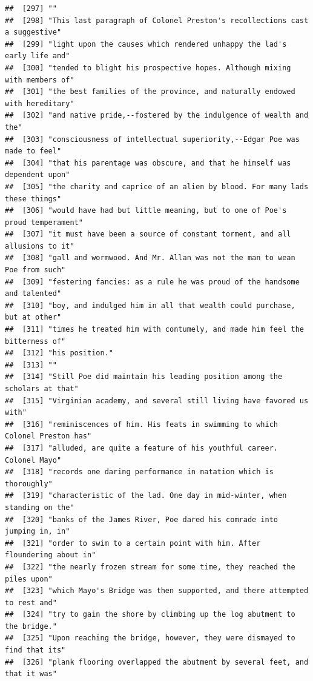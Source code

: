 \documentclass{article}\usepackage[]{graphicx}\usepackage[]{color}
\makeatletter
\newenvironment{kframe}{%
 \def\at@end@of@kframe{}%
 \ifinner\ifhmode%
  \def\at@end@of@kframe{\end{minipage}}%
  \begin{minipage}{\columnwidth}%
 \fi\fi%
 \def\FrameCommand##1{\hskip\@totalleftmargin \hskip-\fboxsep
 \colorbox{shadecolor}{##1}\hskip-\fboxsep
     \hskip-\linewidth \hskip-\@totalleftmargin \hskip\columnwidth}%
 \MakeFramed {\advance\hsize-\width
   \@totalleftmargin\z@ \linewidth\hsize
   \@setminipage}}%
 {\par\unskip\endMakeFramed%
 \at@end@of@kframe}
\newenvironment{knitrout}{}{} %
\makeatother
\begin{document}
\begin{knitrout}
\begin{kframe}
\begin{verbatim}
##  [297] ""                                                                            
##  [298] "This last paragraph of Colonel Preston's recollections cast a suggestive"    
##  [299] "light upon the causes which rendered unhappy the lad's early life and"       
##  [300] "tended to blight his prospective hopes. Although mixing with members of"     
##  [301] "the best families of the province, and naturally endowed with hereditary"    
##  [302] "and native pride,--fostered by the indulgence of wealth and the"             
##  [303] "consciousness of intellectual superiority,--Edgar Poe was made to feel"      
##  [304] "that his parentage was obscure, and that he himself was dependent upon"      
##  [305] "the charity and caprice of an alien by blood. For many lads these things"    
##  [306] "would have had but little meaning, but to one of Poe's proud temperament"    
##  [307] "it must have been a source of constant torment, and all allusions to it"     
##  [308] "gall and wormwood. And Mr. Allan was not the man to wean Poe from such"      
##  [309] "festering fancies: as a rule he was proud of the handsome and talented"      
##  [310] "boy, and indulged him in all that wealth could purchase, but at other"       
##  [311] "times he treated him with contumely, and made him feel the bitterness of"    
##  [312] "his position."                                                               
##  [313] ""                                                                            
##  [314] "Still Poe did maintain his leading position among the scholars at that"      
##  [315] "Virginian academy, and several still living have favored us with"            
##  [316] "reminiscences of him. His feats in swimming to which Colonel Preston has"    
##  [317] "alluded, are quite a feature of his youthful career. Colonel Mayo"           
##  [318] "records one daring performance in natation which is thoroughly"              
##  [319] "characteristic of the lad. One day in mid-winter, when standing on the"      
##  [320] "banks of the James River, Poe dared his comrade into jumping in, in"         
##  [321] "order to swim to a certain point with him. After floundering about in"       
##  [322] "the nearly frozen stream for some time, they reached the piles upon"         
##  [323] "which Mayo's Bridge was then supported, and there attempted to rest and"     
##  [324] "try to gain the shore by climbing up the log abutment to the bridge."        
##  [325] "Upon reaching the bridge, however, they were dismayed to find that its"      
##  [326] "plank flooring overlapped the abutment by several feet, and that it was"     

\end{verbatim}
\end{kframe}
\end{knitrout}
\end{document}

